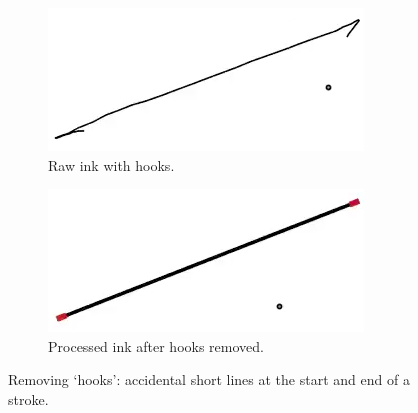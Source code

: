 \begin{figure}
  \centering
  \begin{subfigure}[t]{0.42\textwidth}
    \includegraphics[width=\linewidth]{img/hook-1.png}
    \caption{Raw ink with hooks.}
    \label{fig:hook-1}
  \end{subfigure}
  \hspace{1cm} %
  \begin{subfigure}[t]{0.42\textwidth}
    \includegraphics[width=\linewidth]{img/hook-2.png}
    \caption{Processed ink after hooks removed.}
    \label{fig:hook-2}
  \end{subfigure}
  \caption[Hook Removal]{Removing `hooks': accidental short lines at
    the start and end of a stroke.}
  \label{fig:hooks}
\end{figure}
